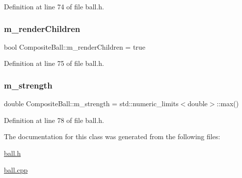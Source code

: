 Definition at line 74 of file ball.\+h.

\mbox{\label{class_composite_ball_a751e10b0f9278bcf48720ac6af9bdd20}} 
\subsubsection{\texorpdfstring{m\+\_\+render\+Children}{m\_renderChildren}}
{\footnotesize\ttfamily bool Composite\+Ball\+::m\+\_\+render\+Children = true\hspace{0.3cm}{\ttfamily [protected]}}



Definition at line 75 of file ball.\+h.

\mbox{\label{class_composite_ball_a78051a7a01a600b88ed22e7d725640db}} 
\subsubsection{\texorpdfstring{m\+\_\+strength}{m\_strength}}
{\footnotesize\ttfamily double Composite\+Ball\+::m\+\_\+strength = std\+::numeric\+\_\+limits$<$double$>$\+::max()\hspace{0.3cm}{\ttfamily [protected]}}



Definition at line 78 of file ball.\+h.



The documentation for this class was generated from the following files\+:\begin{DoxyCompactItemize}
\item 
\mbox{\hyperlink{ball_8h}{ball.\+h}}\item 
\mbox{\hyperlink{ball_8cpp}{ball.\+cpp}}\end{DoxyCompactItemize}
